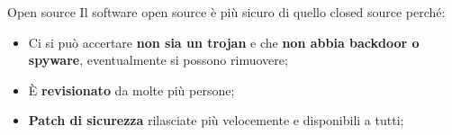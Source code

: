\begin{myframe}{Open source}
  Il software open source è più sicuro di quello closed source perché:
  \begin{itemize}[<+->]
    \item Ci si può accertare \textbf{non sia un trojan} e che \textbf{non abbia backdoor o spyware}, eventualmente si possono rimuovere;
    \item È \textbf{revisionato} da molte più persone;
    \item \textbf{Patch di sicurezza} rilasciate più velocemente e disponibili a tutti;
  \end{itemize}
\end{myframe}

